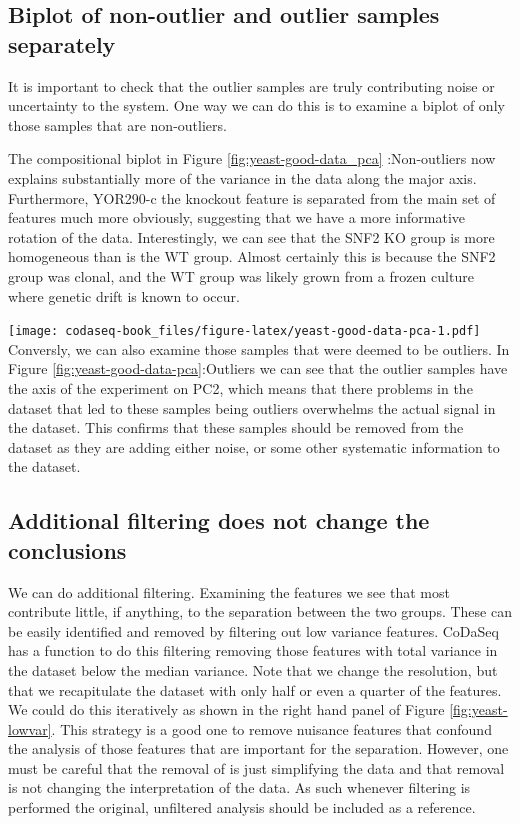 \documentclass[
  onecolumn]{article}
\begin{document}
\hypertarget{biplot-of-non-outlier-and-outlier-samples-separately}{%
\subsection{Biplot of non-outlier and outlier samples separately}\label{biplot-of-non-outlier-and-outlier-samples-separately}}

It is important to check that the outlier samples are truly contributing noise or uncertainty to the system. One way we can do this is to examine a biplot of only those samples that are non-outliers.

The compositional biplot in Figure \ref{fig:yeast-good-data_pca} :Non-outliers now explains substantially more of the variance in the data along the major axis. Furthermore, YOR290-c the knockout feature is separated from the main set of features much more obviously, suggesting that we have a more informative rotation of the data. Interestingly, we can see that the SNF2 KO group is more homogeneous than is the WT group. Almost certainly this is because the SNF2 group was clonal, and the WT group was likely grown from a frozen culture where genetic drift is known to occur.

\texttt{[image: codaseq-book\_files/figure-latex/yeast-good-data-pca-1.pdf]}
Conversly, we can also examine those samples that were deemed to be outliers. In Figure \ref{fig:yeast-good-data-pca}:Outliers we can see that the outlier samples have the axis of the experiment on PC2, which means that there problems in the dataset that led to these samples being outliers overwhelms the actual signal in the dataset. This confirms that these samples should be removed from the dataset as they are adding either noise, or some other systematic information to the dataset.

\clearpage

\hypertarget{additional-filtering-does-not-change-the-conclusions}{%
\subsection{Additional filtering does not change the conclusions}\label{additional-filtering-does-not-change-the-conclusions}}

We can do additional filtering. Examining the features we see that most contribute little, if anything, to the separation between the two groups. These can be easily identified and removed by filtering out low variance features. CoDaSeq has a function to do this filtering removing those features with total variance in the dataset below the median variance. Note that we change the resolution, but that we recapitulate the dataset with only half or even a quarter of the features. We could do this iteratively as shown in the right hand panel of Figure \ref{fig:yeast-lowvar}. This strategy is a good one to remove nuisance features that confound the analysis of those features that are important for the separation. However, one must be careful that the removal of is just simplifying the data and that removal is not changing the interpretation of the data. As such whenever filtering is performed the original, unfiltered analysis should be included as a reference.
\end{document}

